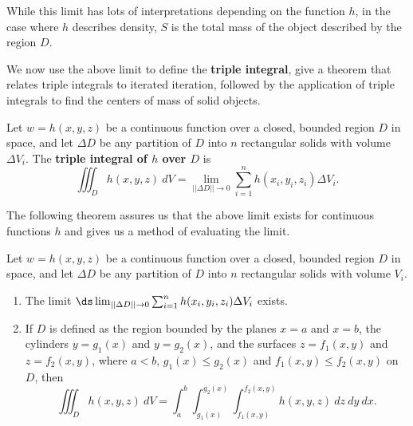 While this limit has lots of interpretations depending on the function $h$, in the case where $h$ describes density, $S$ is the total mass of the object described by the region $D$.

We now use the above limit to define the \textbf{triple integral}, give a theorem that relates triple integrals to iterated iteration, followed by the application of triple integrals to find the centers of mass of solid objects.

{Let $w=h(x,y,z)$ be a continuous function over a closed, bounded region $D$ in space, and let $\Delta D$ be any partition of $D$ into $n$ rectangular solids with volume $\Delta V_i$. The \textbf{triple integral of $h$ over $D$} is
$$\iiint_Dh(x,y,z)\ dV = \lim_{||\Delta D||\to 0}\sum_{i=1}^n h(x_i,y_i,z_i)\Delta V_i.$$
}

The following theorem assures us that the above limit exists for continuous functions $h$ and gives us a method of evaluating the limit.

{Let $w=h(x,y,z)$ be a continuous function over a closed, bounded region $D$ in space, and let $\Delta D$ be any partition of $D$ into $n$ rectangular solids with volume $V_i$.

\begin{enumerate}
\item		The limit $\ds \lim_{||\Delta D||\to 0}\sum_{i=1}^n h(x_i,y_i,z_i)\Delta V_i$ exists.

\item		If $D$ is defined as the region bounded by the planes $x=a$ and $x=b$, the cylinders $y=g_1(x)$ and $y=g_2(x)$, and the surfaces $z=f_1(x,y)$ and $z=f_2(x,y)$, where $a<b$, $g_1(x)\leq g_2(x)$ and $f_1(x,y)\leq f_2(x,y)$ on $D$, then
	$$\iiint_D h(x,y,z)\ dV = \int_a^b\int_{g_1(x)}^{g_2(x)}\int_{f_1(x,y)}^{f_2(x,y)} h(x,y,z)\ dz\ dy\ dx.$$

\end{enumerate}
}

